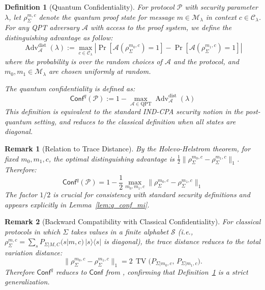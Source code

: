 \documentclass{ieeeaccess}
\newcommand{\Conf}{\mathsf{Conf}}
\DeclareMathOperator{\TV}{TV}
\DeclareMathOperator{\Adv}{Adv}
\newtheorem{definition}{Definition}[section]
\newtheorem{remark}{Remark}[section]
\begin{document}
\begin{definition}[Quantum Confidentiality]
\label{def:confq}
For protocol $\mathcal{P}$ with security parameter $\lambda$, let $\rho_\Sigma^{m,c}$ denote the quantum proof state for message $m \in \mathcal{M}_\lambda$ in context $c \in \mathcal{C}_\lambda$. For any QPT adversary $\mathcal{A}$ with access to the proof system, we define the distinguishing advantage as follow:
\begin{equation}
    \Adv^{\mathrm{dist}}_{\mathcal{A}}(\lambda) := \max_{c \in \mathcal{C}_\lambda} \left| \Pr[\mathcal{A}(\rho_\Sigma^{m_0,c}) = 1] - \Pr[\mathcal{A}(\rho_\Sigma^{m_1,c}) = 1] \right|
\end{equation}
where the probability is over the random choices of $\mathcal{A}$ and the protocol, and $m_0, m_1 \in \mathcal{M}_\lambda$ are chosen uniformly at random.

The \emph{quantum confidentiality} is defined as:
\begin{equation}
    \Conf^q(\mathcal{P}) := 1 - \max_{\mathcal{A} \in \mathrm{QPT}} \Adv^{\mathrm{dist}}_{\mathcal{A}}(\lambda)
\end{equation}
This definition is equivalent to the standard IND-CPA security notion in the post-quantum setting, and reduces to the classical definition when all states are diagonal.
\end{definition}

\begin{remark}[Relation to Trace Distance]
By the Holevo-Helstrom theorem, for fixed $m_0, m_1, c$, the optimal distinguishing advantage is $\frac{1}{2}\|\rho_\Sigma^{m_0,c} - \rho_\Sigma^{m_1,c}\|_1$. Therefore:
\begin{equation}
    \Conf^q(\mathcal{P}) = 1 - \frac{1}{2} \max_{m_0,m_1,c} \|\rho_\Sigma^{m_0,c} - \rho_\Sigma^{m_1,c}\|_1
\end{equation}
The factor $1/2$ is crucial for consistency with standard security definitions and appears explicitly in Lemma~\ref{lem:q_conf_mi}.
\end{remark}


\begin{remark}[Backward Compatibility with Classical Confidentiality]
\label{rem:confq_classical}
For classical protocols in which $\Sigma$ takes values in a finite alphabet $\mathcal{S}$ (i.e., $\rho_\Sigma^{m,c} = \sum_{s} P_{\Sigma|M,C}(s|m,c)\,|s\rangle\langle s|$ is diagonal), the trace distance reduces to the total variation distance:
\begin{equation}
    \|\rho_\Sigma^{m_0,c} - \rho_\Sigma^{m_1,c}\|_1
    = 2\,\TV\!\bigl(P_{\Sigma|m_0,c},\, P_{\Sigma|m_1,c}\bigr).
\end{equation}
Therefore $\Conf^q$ reduces to $\Conf$ from \cite[Definition~III-B.1]{Minka2026CRO}, confirming that Definition~\ref{def:confq} is a strict generalization.
\end{remark}
\end{document}
